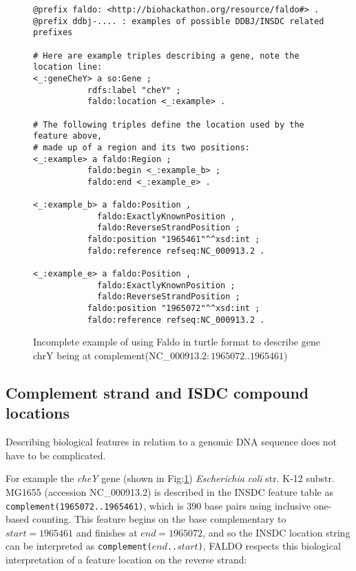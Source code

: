 %
\begin{figure}
\begin{shaded}
\small
\begin{verbatim} 
@prefix faldo: <http://biohackathon.org/resource/faldo#> .
@prefix ddbj-.... : examples of possible DDBJ/INSDC related prefixes

# Here are example triples describing a gene, note the location line:
<_:geneCheY> a so:Gene ;
           rdfs:label "cheY" ;
           faldo:location <_:example> .

# The following triples define the location used by the feature above,
# made up of a region and its two positions:
<_:example> a faldo:Region ;
           faldo:begin <_:example_b> ;
           faldo:end <_:example_e> .

<_:example_b> a faldo:Position ,
             faldo:ExactlyKnownPosition ,
             faldo:ReverseStrandPosition ;
           faldo:position "1965461"^^xsd:int ;
           faldo:reference refseq:NC_000913.2 .

<_:example_e> a faldo:Position ,
             faldo:ExactlyKnownPosition ;
             faldo:ReverseStrandPosition ;
           faldo:position "1965072"^^xsd:int ;
           faldo:reference refseq:NC_000913.2 .
\end{verbatim}
\end{shaded}
\caption{Incomplete example of using Faldo in turtle format to describe
gene chrY being at complement(NC\_$000913.2:1965072..1965461$)}
\label{fig:insdcComplement}
\end{figure}


\subsection*{Complement strand and ISDC compound locations}

Describing biological features in relation to a genomic DNA sequence does not have to be complicated.

For example the \textit{cheY} gene (shown in Fig:\ref{fig:insdcComplement}) 
\textit{Escherichia coli} str. K-12 substr. MG1655 (accession NC\_000913.2)
is described in the INSDC feature table as \texttt{complement(1965072..1965461)},
which is 390 base pairs using inclusive one-based counting.
This feature begins on the base complementary to $start = 1965461$
and finishes at $end = 1965072$, and so the INSDC location string
can be interpreted as \texttt{complement($end$..$start$)},
FALDO respects this biological interpretation of a feature location
on the reverse strand:

